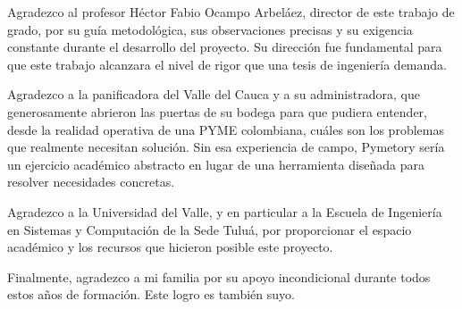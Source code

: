 \vspace*{4cm}
{
\raggedleft
\begin{itshape}
Agradezco al profesor Héctor Fabio Ocampo Arbeláez, director de este trabajo de grado, por su guía metodológica, sus observaciones precisas y su exigencia constante durante el desarrollo del proyecto. Su dirección fue fundamental para que este trabajo alcanzara el nivel de rigor que una tesis de ingeniería demanda.


Agradezco a la panificadora del Valle del Cauca y a su administradora, que generosamente abrieron las puertas de su bodega para que pudiera entender, desde la realidad operativa de una PYME colombiana, cuáles son los problemas que realmente necesitan solución. Sin esa experiencia de campo, Pymetory sería un ejercicio académico abstracto en lugar de una herramienta diseñada para resolver necesidades concretas.

Agradezco a la Universidad del Valle, y en particular a la Escuela de Ingeniería en Sistemas y Computación de la Sede Tuluá, por proporcionar el espacio académico y los recursos que hicieron posible este proyecto.

Finalmente, agradezco a mi familia por su apoyo incondicional durante todos estos años de formación. Este logro es también suyo.
\end{itshape}
}
